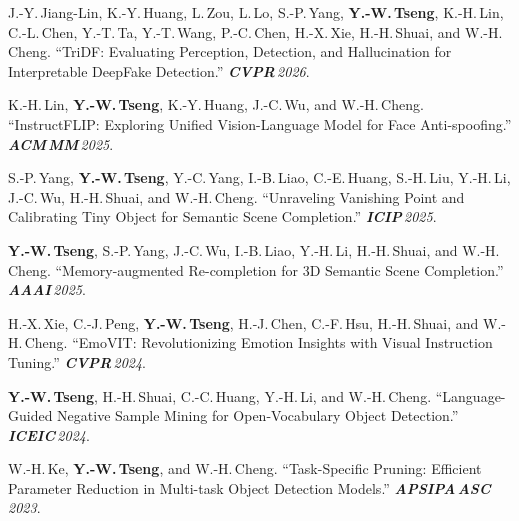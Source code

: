 \documentclass[10pt, a4paper]{article}
\begin{document}
\vspace{4pt}
\vspace{1pt}
\begin{enumerate}[leftmargin=*, topsep=2pt, itemsep=2pt, parsep=0pt, label={\small[\arabic*]}]
    \item\small J.-Y.\,Jiang-Lin, K.-Y.\,Huang, L.\,Zou, L.\,Lo, S.-P.\,Yang, \textbf{Y.-W.\,Tseng}, K.-H.\,Lin, C.-L.\,Chen, Y.-T.\,Ta, Y.-T.\,Wang, P.-C.\,Chen, H.-X.\,Xie, H.-H.\,Shuai, and W.-H.\,Cheng.
    ``TriDF: Evaluating Perception, Detection, and Hallucination for Interpretable DeepFake Detection.''
    \textit{\textbf{CVPR}\,2026}.\enspace\href{https://arxiv.org/abs/2512.10652}{}\enspace\href{https://j1anglin.github.io/TriDF/}{}

    \item\small K.-H.\,Lin, \textbf{Y.-W.\,Tseng}, K.-Y.\,Huang, J.-C.\,Wu, and W.-H.\,Cheng.
    ``InstructFLIP: Exploring Unified Vision-Language Model for Face Anti-spoofing.''
    \textit{\textbf{ACM\,MM}\,2025}.\enspace\href{https://arxiv.org/abs/2507.12060}{}\enspace\href{https://kunkunlin1221.github.io/InstructFLIP/}{}\enspace\href{https://github.com/kunkunlin1221/InstructFLIP}{}

    \item\small S.-P.\,Yang, \textbf{Y.-W.\,Tseng}, Y.-C.\,Yang, I.-B.\,Liao, C.-E.\,Huang, S.-H.\,Liu, Y.-H.\,Li, J.-C.\,Wu, H.-H.\,Shuai, and W.-H.\,Cheng.
    ``Unraveling Vanishing Point and Calibrating Tiny Object for Semantic Scene Completion.''
    \textit{\textbf{ICIP}\,2025}.

    \item\small \textbf{Y.-W.\,Tseng}, S.-P.\,Yang, J.-C.\,Wu, I.-B.\,Liao, Y.-H.\,Li, H.-H.\,Shuai, and W.-H.\,Cheng.
    ``Memory-augmented Re-completion for 3D Semantic Scene Completion.''
    \textit{\textbf{AAAI}\,2025}.\enspace\href{https://ojs.aaai.org/index.php/AAAI/article/view/32801}{}\enspace\href{https://github.com/ywt0209/MARE}{}

    \item\small H.-X.\,Xie, C.-J.\,Peng, \textbf{Y.-W.\,Tseng}, H.-J.\,Chen, C.-F.\,Hsu, H.-H.\,Shuai, and W.-H.\,Cheng.
    ``EmoVIT: Revolutionizing Emotion Insights with Visual Instruction Tuning.''
    \textit{\textbf{CVPR}\,2024}.\enspace\href{https://arxiv.org/abs/2404.16670}{}\enspace\href{https://github.com/aimmemotion/EmoVIT}{}

    \item\small \textbf{Y.-W.\,Tseng}, H.-H.\,Shuai, C.-C.\,Huang, Y.-H.\,Li, and W.-H.\,Cheng.
    ``Language-Guided Negative Sample Mining for Open-Vocabulary Object Detection.''
    \textit{\textbf{ICEIC}\,2024}.\enspace\href{https://ieeexplore.ieee.org/document/10457133}{}

    \item\small W.-H.\,Ke, \textbf{Y.-W.\,Tseng}, and W.-H.\,Cheng.
    ``Task-Specific Pruning: Efficient Parameter Reduction in Multi-task Object Detection Models.''
    \textit{\textbf{APSIPA\,ASC}\,2023}.
\end{enumerate}
\end{document}
